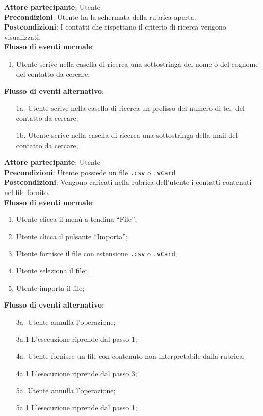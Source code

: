\begin{tcolorbox}[colback=white,colframe=black!80!white,title=\textbf{C4 - Cercare contatto}]
	\textbf{Attore partecipante}: Utente
	\\\textbf{Precondizioni}: Utente ha la schermata della rubrica aperta.
	\\\textbf{Postcondizioni}: I contatti che rispettano il criterio di ricerca vengono visualizzati.
	\\\textbf{Flusso di eventi normale}:
	\begin{enumerate}[noitemsep, topsep=0pt]
		\item Utente scrive nella casella di ricerca una sottostringa del nome o del cognome del contatto da cercare;
	\end{enumerate}
	\textbf{Flusso di eventi alternativo}:
	\begin{itemize}[noitemsep, topsep=0pt]
		\item[1a.] Utente scrive nella casella di ricerca un prefisso del numero di tel. del contatto da cercare;
		\item[1b.] Utente scrive nella casella di ricerca una sottostringa della mail del contatto da cercare;
	\end{itemize}
\end{tcolorbox}

\begin{tcolorbox}[colback=white,colframe=black!80!white,title=\textbf{C5 - Importare rubrica}]
	\textbf{Attore partecipante}: Utente
	\\\textbf{Precondizioni}: Utente possiede un file \texttt{.csv} o \texttt{.vCard}
	\\\textbf{Postcondizioni}: Vengono caricati nella rubrica dell’utente i contatti contenuti nel file fornito.
	\\\textbf{Flusso di eventi normale}:
	\begin{enumerate}[noitemsep, topsep=0pt]
		\item Utente clicca il menù a tendina “File”;
		\item Utente clicca il pulsante “Importa”;
		\item Utente fornisce il file con estensione \texttt{.csv} o \texttt{.vCard};
		\item Utente seleziona il file;
		\item Utente importa il file;	
	\end{enumerate}
	\textbf{Flusso di eventi alternativo}:
	\begin{itemize}[noitemsep, topsep=0pt]
		\item[3a. ] Utente annulla l’operazione;
		\item[3a.1] L’esecuzione riprende dal passo 1;
		\item[4a. ] Utente fornisce un file con contenuto non interpretabile dalla rubrica;
		\item[4a.1] L’esecuzione riprende dal passo 3;
		\item[5a. ] Utente annulla l’operazione;
		\item[5a.1] L’esecuzione riprende dal passo 1;
		
	\end{itemize}
\end{tcolorbox}

